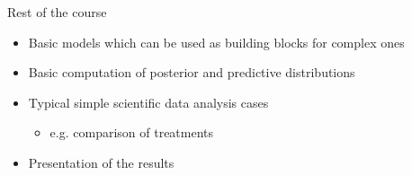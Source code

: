 \documentclass[10pt]{beamer}
\begin{document}
%

\begin{frame}{Rest of the course}

  \begin{itemize}
  \item Basic models which can be used as building blocks for complex ones
    \vspace{\baselineskip}
  \item Basic computation of posterior and predictive distributions
    \vspace{\baselineskip}
  \item Typical simple scientific data analysis cases
     \begin{itemize}
     \item e.g. comparison of treatments
     \end{itemize}
    \vspace{\baselineskip}
  \item Presentation of the results
  \end{itemize}
\end{frame}

%
\end{document}
